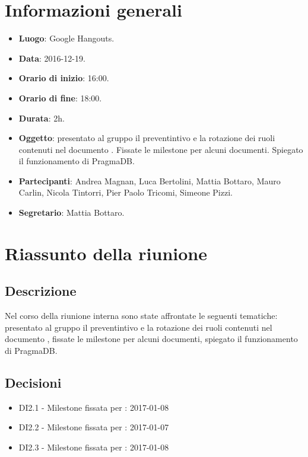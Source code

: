 \documentclass[a4paper,titlepage]{article}
\begin{document}
\maketitle
\begin{diario}
\end{diario}
\newpage
\tableofcontents

\newpage
\section{Informazioni generali}
	\label{sec:Informazioni}

	\begin{itemize}
		\item \textbf{Luogo}: Google Hangouts.
		\item \textbf{Data}: 2016-12-19.
		\item \textbf{Orario di inizio}: 16:00.
		\item \textbf{Orario di fine}: 18:00.
		\item \textbf{Durata}: 2h.
		\item \textbf{Oggetto}: presentato al gruppo il preventintivo e la rotazione dei ruoli contenuti nel documento \textit{}. Fissate le milestone per alcuni documenti. Spiegato il funzionamento di PragmaDB.
		\item \textbf{Partecipanti}: Andrea Magnan, Luca Bertolini, Mattia Bottaro, Mauro Carlin, Nicola Tintorri, Pier Paolo Tricomi, Simeone Pizzi.
		\item \textbf{Segretario}: Mattia Bottaro.
	  
	\end{itemize}

\section{Riassunto della riunione}
	\subsection{Descrizione}
	Nel corso della riunione interna sono state affrontate le seguenti tematiche: presentato al gruppo il preventintivo e la rotazione dei ruoli contenuti nel documento \PPdocRR{}, fissate le milestone per alcuni documenti, spiegato il funzionamento di PragmaDB.
	
	\subsection{Decisioni}
		\begin{itemize}
			\item DI2.1 - Milestone fissata per \PQdocRR{}: 2017-01-08
			\item DI2.2 - Milestone fissata per \ARdocRR{}: 2017-01-07
			\item DI2.3 - Milestone fissata per \Gldoc{}: 2017-01-08
		\end{itemize}
\end{document}
